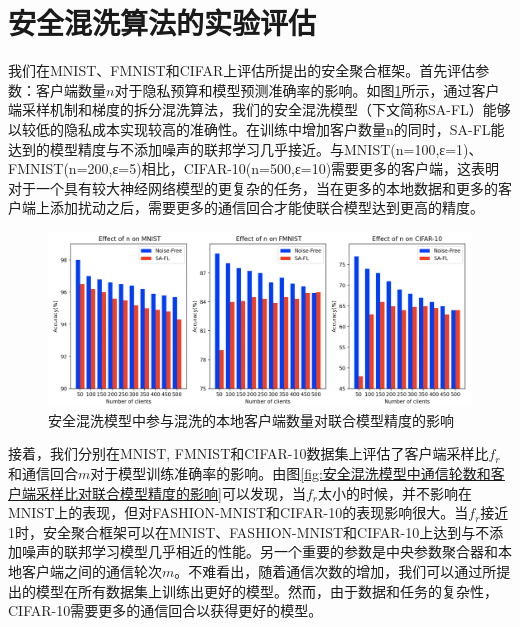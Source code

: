 \section{安全混洗算法的实验评估}
我们在MNIST、FMNIST和CIFAR上评估所提出的安全聚合框架。首先评估参数：客户端数量$n$对于隐私预算和模型预测准确率的影响。如图\ref{fig:安全混洗模型中参与混洗的本地客户端数量对联合模型精度的影响}所示，通过客户端采样机制和梯度的拆分混洗算法，我们的安全混洗模型（下文简称SA-FL）能够以较低的隐私成本实现较高的准确性。在训练中增加客户数量n的同时，SA-FL能达到的模型精度与不添加噪声的联邦学习几乎接近。与MNIST(n=100,ε=1)、FMNIST(n=200,ε=5)相比，CIFAR-10(n=500,ε=10)需要更多的客户端，这表明对于一个具有较大神经网络模型的更复杂的任务，当在更多的本地数据和更多的客户端上添加扰动之后，需要更多的通信回合才能使联合模型达到更高的精度。

\begin{figure}[!hbt]
\centering
  	\includegraphics[scale=0.37]{fig2/C5/SA-FL}%
	\caption{安全混洗模型中参与混洗的本地客户端数量对联合模型精度的影响}
  	\label{fig:安全混洗模型中参与混洗的本地客户端数量对联合模型精度的影响} 
\end{figure}

接着，我们分别在MNIST, FMNIST和CIFAR-10数据集上评估了客户端采样比$f_{r}$和通信回合$m$对于模型训练准确率的影响。由图\ref{fig:安全混洗模型中通信轮数和客户端采样比对联合模型精度的影响}可以发现，当$f_{r}$太小的时候，并不影响在MNIST上的表现，但对FASHION-MNIST和CIFAR-10的表现影响很大。当$f_{r}$接近1时，安全聚合框架可以在MNIST、FASHION-MNIST和CIFAR-10上达到与不添加噪声的联邦学习模型几乎相近的性能。另一个重要的参数是中央参数聚合器和本地客户端之间的通信轮次$m$。不难看出，随着通信次数的增加，我们可以通过所提出的模型在所有数据集上训练出更好的模型。然而，由于数据和任务的复杂性，CIFAR-10需要更多的通信回合以获得更好的模型。

